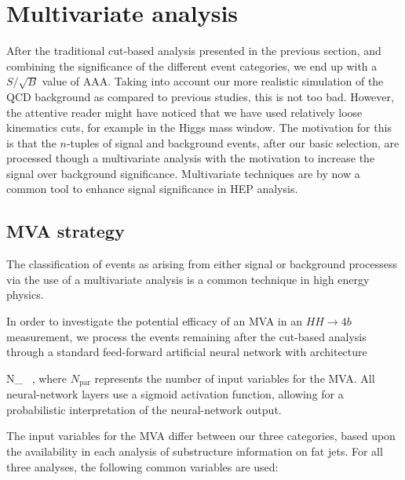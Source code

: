
\section{Multivariate analysis}
\label{sec:mva}

After the traditional cut-based analysis presented in the previous section,
and combining the significance of the different event categories,
we end up with a $S/\sqrt{B}$ value of AAA.
%
Taking into account our more realistic simulation of the QCD background as
compared to previous studies, this is not too bad.
%
However, the attentive reader might have noticed that we have used
relatively 
loose kinematics cuts, for example in the Higgs mass window.
%
The motivation for this is that the $n$-tuples of signal and background
events, after our basic selection, are processed though a multivariate
analysis with the motivation to increase the signal over background
significance.
%
Multivariate techniques are by now a common tool to enhance signal
significance in HEP analysis.

\subsection{MVA strategy}

The classification of events as arising from either signal or
background processess via the use of a multivariate analysis is a common
technique in high energy physics.

In order to investigate the potential efficacy of an MVA in an $HH\to 4b$
measurement, we process the events remaining after the cut-based analysis 
through a standard feed-forward artificial neural network with architecture

\be
\label{eq:nn1}
N_{} \, ,
\ee
where $N_{\mathrm{par}}$ represents the number of input variables for the MVA.
All neural-network layers use a sigmoid activation function, allowing for a probabilistic
interpretation of the neural-network output.

The input variables for the MVA differ between our three categories, based upon
the availability in each analysis of substructure information on fat jets. For all
three analyses, the following common variables are used:

